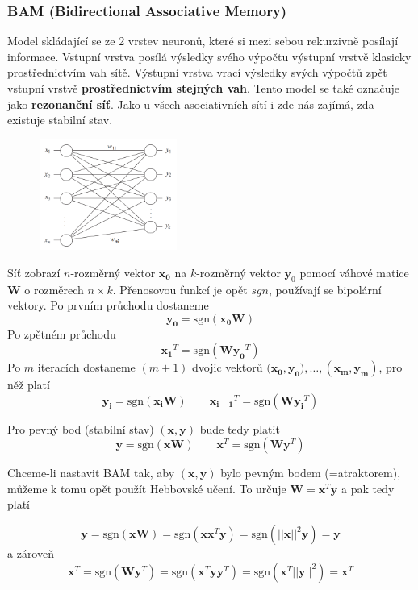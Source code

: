 \documentclass[11pt]{report} %
\renewcommand{\vec}[1]{\mathbf{#1}}
\numberwithin{equation}{section}
\begin{document}
\subsubsection{BAM (Bidirectional Associative Memory)}
Model skládající se ze 2 vrstev neuronů, které si mezi sebou rekurzivně posílají informace. Vstupní vrstva posílá výsledky svého výpočtu výstupní vrstvě klasicky prostřednictvím vah sítě.  Výstupní vrstva vrací výsledky svých výpočtů zpět vstupní vrstvě \textbf{prostřednictvím stejných vah}. Tento model se také označuje jako \textbf{rezonanční síť}. Jako u všech asociativních sítí i zde nás zajímá, zda existuje stabilní stav.

\begin{figure}
	\includegraphics[width=0.4\textwidth]{img/bam.png}
\end{figure}
Síť zobrazí $n$-rozměrný vektor $\vec{x_0}$ na $k$-rozměrný vektor $\vec{y}_0$ pomocí váhové matice $\vec{W}$ o rozměrech $n \times k$. Přenosovou funkcí je opět $sgn$, používají se bipolární vektory. Po prvním průchodu dostaneme
$$\vec{y_0} = \text{sgn}(\vec{x_0}\vec{W})$$
Po zpětném průchodu
$$\vec{x_1}^T = \text{sgn}(\vec{W}\vec{y_0}^T)$$
Po $m$ iteracích dostaneme $(m+1)$ dvojic vektorů $(\vec{x_0},\vec{y_0), \dots, (\vec{x_m}, \vec{y_m})}$, pro něž platí
\begin{equation}
\label{bam_update}
\vec{y_i} = \text{sgn}(\vec{x_i}\vec{W}) \qquad \vec{x_{i+1}}^T = \text{sgn}(\vec{W}\vec{y_i}^T)
\end{equation}

Pro pevný bod (stabilní stav) $(\vec{x},\vec{y})$ bude tedy platit
$$\vec{y} = \text{sgn}(\vec{x}\vec{W}) \qquad \vec{x}^T = \text{sgn}(\vec{W}\vec{y}^T)$$


Chceme-li nastavit BAM tak, aby $(\vec{x},\vec{y})$ bylo pevným bodem (=atraktorem), můžeme k tomu opět použít Hebbovské učení. To určuje $\vec{W} = \vec{x}^T \vec{y}$ a pak tedy platí

$$\vec{y} = \text{sgn}(\vec{x}\vec{W}) = \text{sgn}(\vec{x}\vec{x}^T\vec{y}) = \text{sgn}(||\vec{x}||^2\vec{y}) = \vec{y}$$
a zároveň
$$\vec{x}^T = \text{sgn}(\vec{W}\vec{y}^T) = \text{sgn}(\vec{x}^T\vec{y}\vec{y}^T) = \text{sgn}(\vec{x}^T||\vec{y}||^2) = \vec{x}^T$$
\end{document}
